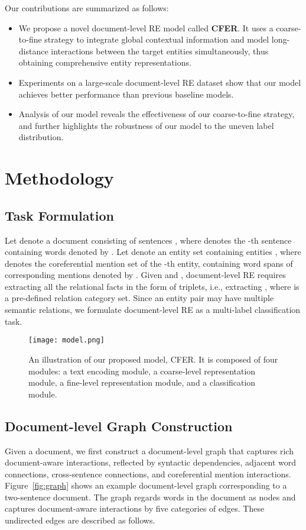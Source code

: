\documentclass[letterpaper]{article} \usepackage{aaai21}  \usepackage{times}  \usepackage{helvet} \usepackage{courier}  \usepackage[hyphens]{url}  \usepackage{graphicx} \urlstyle{rm} \def\UrlFont{\rm}  \usepackage{natbib}  \usepackage{caption} \frenchspacing  \setlength{\pdfpagewidth}{8.5in}  \setlength{\pdfpageheight}{11in}
\begin{document}
Our contributions are summarized as follows: 
\begin{itemize}
    \item 
    We propose a novel document-level RE model called \textbf{CFER}. 
    It uses a coarse-to-fine strategy to integrate global contextual information and model long-distance interactions between the target entities simultaneously, thus obtaining comprehensive entity representations. 
    \item 
    Experiments on a large-scale document-level RE dataset show that our model achieves better performance than previous baseline models. 
    \item 
    Analysis of our model reveals the effectiveness of our coarse-to-fine strategy, and further highlights the robustness of our model to the uneven label distribution. 
\end{itemize}

\section{Methodology}

\subsection{Task Formulation}

Let  denote a document consisting of  sentences , 
where  denotes the -th sentence containing  words denoted by . 
Let  denote an entity set containing  entities , where  denotes the coreferential mention set of the -th entity, containing  word spans of corresponding mentions denoted by . 
Given  and ,  document-level RE requires extracting all the relational facts in the form of triplets, i.e., extracting , where  is a pre-defined relation category set. 
Since an entity pair may have multiple semantic relations, we formulate document-level RE as a multi-label classification task. 

\begin{figure*}[t]
\centering
\texttt{[image: model.png]}
\caption{
An illustration of our proposed model, CFER. 
It is composed of four modules: a text encoding module, a coarse-level representation module, a fine-level representation module, and a classification module. 
}
\label{fig:model}
\end{figure*}

\subsection{Document-level Graph Construction}
Given a document, we first construct a document-level graph that captures rich document-aware interactions, reflected by syntactic dependencies, adjacent word connections, cross-sentence connections, and coreferential mention interactions. 
Figure~\ref{fig:graph} shows an example document-level graph corresponding to a two-sentence document. 
The graph regards words in the document as nodes and captures document-aware interactions by five categories of edges. 
These undirected edges are described as follows. 
\end{document}
